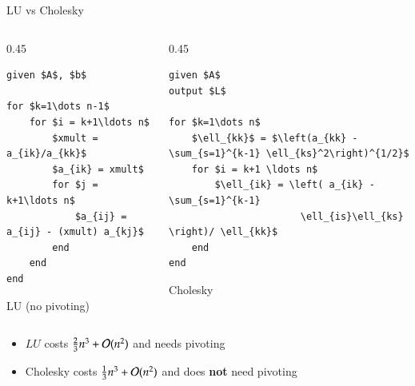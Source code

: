 \documentclass[10pt]{beamer}
\begin{document}

\begin{frame}[fragile]{LU vs Cholesky}
\begin{columns}
    \begin{column}{0.45\textwidth}
\begin{lstlisting}[mathescape]
given $A$, $b$
                           
for $k=1\dots n-1$          
    for $i = k+1\ldots n$      
        $xmult = a_{ik}/a_{kk}$
        $a_{ik} = xmult$      
        for $j = k+1\ldots n$      
            $a_{ij} = a_{ij} - (xmult) a_{kj}$
        end                      
    end                        
end                          
\end{lstlisting}
\begin{center}
    LU (no pivoting)
\end{center}
    \end{column}
    \begin{column}{0.45\textwidth}
\begin{lstlisting}[mathescape,label=algo:chol]
given $A$
output $L$
                           
for $k=1\dots n$          
    $\ell_{kk}$ = $\left(a_{kk} - \sum_{s=1}^{k-1} \ell_{ks}^2\right)^{1/2}$
    for $i = k+1 \ldots n$      
        $\ell_{ik} = \left( a_{ik} - \sum_{s=1}^{k-1}
                       \ell_{is}\ell_{ks} \right)/ \ell_{kk}$
    end
end                          
\end{lstlisting}
\begin{center}
    Cholesky
\end{center}
    \end{column}
\end{columns}
\vspace{0.5cm}
\begin{center}
\begin{itemize}
    \item $LU$ costs $\frac{2}{3}n^3+{\mathcal{O}}(n^2)$ and needs pivoting
    \item Cholesky costs $\frac{1}{3}n^3+{\mathcal{O}}(n^2)$ and does \textbf{not} need pivoting
\end{itemize}
\end{center}
\end{frame}
\end{document}
